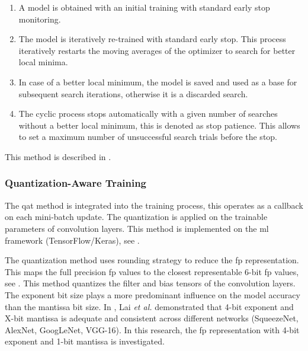 \begin{enumerate}
	\item A model is obtained with an initial training with standard early stop monitoring.
	\item The model is iteratively re-trained with standard early stop. This process iteratively restarts the moving averages of the optimizer to search for better local minima.
	\item In case of a better local minimum, the model is saved and used as a base for subsequent search iterations, otherwise it is a discarded search.
	\item The cyclic process stops automatically with a given number of searches without a better local minimum, this is denoted as stop patience. This allows to set a maximum number of unsuccessful search trials before the stop.
\end{enumerate}

This method is described in .

\subsubsection{Quantization-Aware Training}
The \gls{qat} method is integrated into the training process, this operates as a callback on each mini-batch update. The quantization is applied on the trainable parameters of convolution layers. This method is implemented on the \gls{ml} framework (TensorFlow/Keras), see .

The quantization method uses rounding strategy to reduce the \gls{fp} representation. This maps the full precision \gls{fp} values to the closest representable 6-bit \gls{fp} values, see . This method quantizes the filter and bias tensors of the convolution layers. The exponent bit size plays a more predominant influence on the model accuracy than the mantissa bit size. In \cite{lai2017deep}, Lai \textit{et al.} demonstrated that 4-bit exponent and X-bit mantissa is adequate and consistent across different networks (SqueezeNet, AlexNet, GoogLeNet, VGG-16). In this research, the \gls{fp} representation with 4-bit exponent and 1-bit mantissa is investigated.

